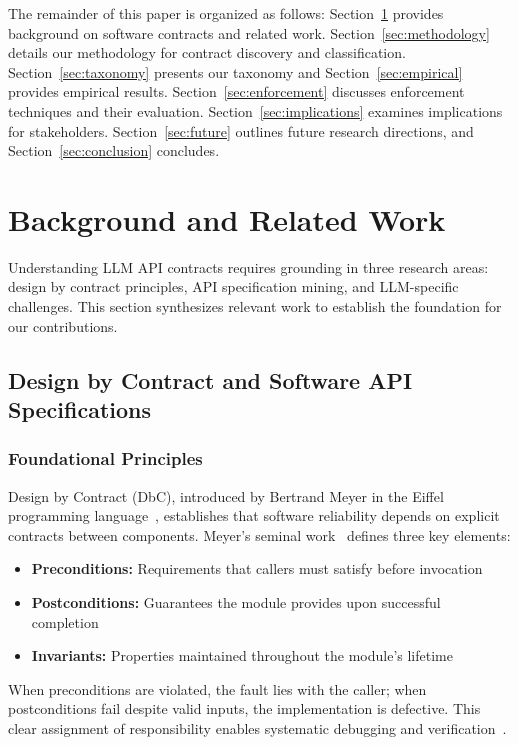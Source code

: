 \documentclass[11pt]{article}
\begin{document}
The remainder of this paper is organized as follows: Section~\ref{sec:background} provides background on software contracts and related work. Section~\ref{sec:methodology} details our methodology for contract discovery and classification. Section~\ref{sec:taxonomy} presents our taxonomy and Section~\ref{sec:empirical} provides empirical results. Section~\ref{sec:enforcement} discusses enforcement techniques and their evaluation. Section~\ref{sec:implications} examines implications for stakeholders. Section~\ref{sec:future} outlines future research directions, and Section~\ref{sec:conclusion} concludes.

\section{Background and Related Work}
\label{sec:background}

Understanding LLM API contracts requires grounding in three research areas: design by contract principles, API specification mining, and LLM-specific challenges. This section synthesizes relevant work to establish the foundation for our contributions.

\subsection{Design by Contract and Software API Specifications}

\subsubsection{Foundational Principles}
Design by Contract (DbC), introduced by Bertrand Meyer in the Eiffel programming language~\cite{meyer1992applying}, establishes that software reliability depends on explicit contracts between components. Meyer's seminal work~\cite{meyer1997object} defines three key elements:
\begin{itemize}
    \item \textbf{Preconditions:} Requirements that callers must satisfy before invocation
    \item \textbf{Postconditions:} Guarantees the module provides upon successful completion
    \item \textbf{Invariants:} Properties maintained throughout the module's lifetime
\end{itemize}

When preconditions are violated, the fault lies with the caller; when postconditions fail despite valid inputs, the implementation is defective. This clear assignment of responsibility enables systematic debugging and verification~\cite{meyer1991design}.
\end{document}
